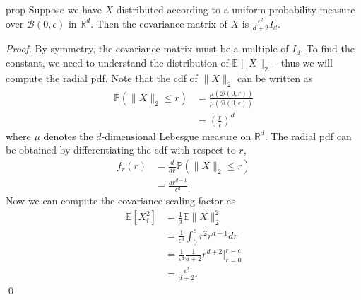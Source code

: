 \documentclass[11pt]{article}
\begin{document}
\begin{restatable}{prop}{} \label{prop: spherical cov}
    Suppose we have $X$ distributed according to a uniform probability measure over $\mathcal{B}(0,\epsilon)$ in $\mathbb{R}^d$. Then the covariance matrix of $X$ is $\frac{\epsilon^2}{d+2}I_d$. 
\end{restatable}
\noindent \textit{Proof.} By symmetry, the covariance matrix must be a multiple of $I_d$. To find the constant, we need to understand the distribution of $\mathbb{E}\|X\|_2$ - thus we will compute the radial pdf. Note that the cdf of $\|X\|_2$ can be written as
\begin{align*}
    \mathbb{P}(\|X\|_2 \leq r) &= \frac{\mu(\mathcal{B}(0,r))}{\mu(\mathcal{B}(0,\epsilon))} \\
    &= \left(\frac{r}{\epsilon }\right)^d
\end{align*}
where $\mu$ denotes the $d$-dimensional Lebesgue measure on $\mathbb{R}^d$. The radial pdf can be obtained by differentiating the cdf with respect to $r$,
\begin{align*}
    f_r(r) &= \frac{d}{dr}\mathbb{P}(\|X\|_2\leq r) \\
    &= \frac{dr^{d-1}}{\epsilon^d}.
\end{align*}
Now we can compute the covariance scaling factor as 
\begin{align*}
    \mathbb{E}[X_i^2] &= \frac{1}{d}\mathbb{E}\|X\|_2^2 \\
    &=\frac{1}{\epsilon^d}\int_{0}^{\epsilon}r^2r^{d-1}dr \\
    &= \frac{1}{\epsilon^d}\frac{1}{d+2}r^{d+2} \Bigg|^{r=\epsilon}_{r=0} \\
    &= \frac{\epsilon^2}{d+2}.
\end{align*}
\qed{}



\end{document}
